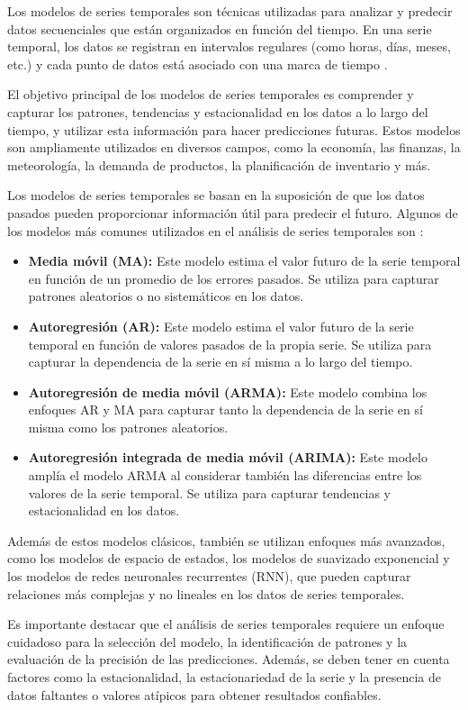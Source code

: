 Los modelos de series temporales son técnicas utilizadas para analizar y predecir datos secuenciales que están organizados en función del tiempo. En una serie temporal, los datos se registran en intervalos regulares (como horas, días, meses, etc.) y cada punto de datos está asociado con una marca de tiempo \cite{time-series}.

El objetivo principal de los modelos de series temporales es comprender y capturar los patrones, tendencias y estacionalidad en los datos a lo largo del tiempo, y utilizar esta información para hacer predicciones futuras. Estos modelos son ampliamente utilizados en diversos campos, como la economía, las finanzas, la meteorología, la demanda de productos, la planificación de inventario y más.

Los modelos de series temporales se basan en la suposición de que los datos pasados pueden proporcionar información útil para predecir el futuro. Algunos de los modelos más comunes utilizados en el análisis de series temporales son \cite{time-series}:
\begin{itemize}
    \item \textbf{Media móvil (MA):} Este modelo estima el valor futuro de la serie temporal en función de un promedio de los errores pasados. Se utiliza para capturar patrones aleatorios o no sistemáticos en los datos.
    \item \textbf{Autoregresión (AR):} Este modelo estima el valor futuro de la serie temporal en función de valores pasados de la propia serie. Se utiliza para capturar la dependencia de la serie en sí misma a lo largo del tiempo.
    \item \textbf{Autoregresión de media móvil (ARMA):} Este modelo combina los enfoques AR y MA para capturar tanto la dependencia de la serie en sí misma como los patrones aleatorios.
    \item \textbf{Autoregresión integrada de media móvil (ARIMA):} Este modelo amplía el modelo ARMA al considerar también las diferencias entre los valores de la serie temporal. Se utiliza para capturar tendencias y estacionalidad en los datos.
\end{itemize}

Además de estos modelos clásicos, también se utilizan enfoques más avanzados, como los modelos de espacio de estados, los modelos de suavizado exponencial y los modelos de redes neuronales recurrentes (RNN), que pueden capturar relaciones más complejas y no lineales en los datos de series temporales.

Es importante destacar que el análisis de series temporales requiere un enfoque cuidadoso para la selección del modelo, la identificación de patrones y la evaluación de la precisión de las predicciones. Además, se deben tener en cuenta factores como la estacionalidad, la estacionariedad de la serie y la presencia de datos faltantes o valores atípicos para obtener resultados confiables.

